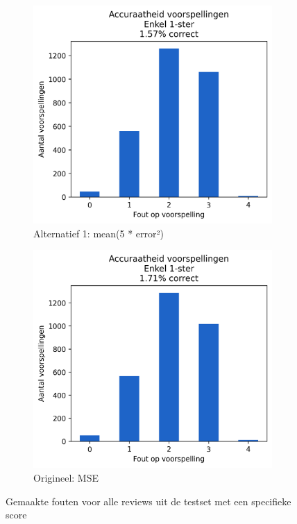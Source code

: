 \begin{figure}[H]
    \begin{subfigure}{.45\textwidth}
        \centering
        \includegraphics[width=1\linewidth]{fig/chapt5/predictor/1ster_nieuwe_loss.png}
        \caption{Alternatief 1: {\selectfont mean(5 * error²)}}
        \label{fig:chapt5_extreem_1ster_nieuwe_loss}
    \end{subfigure}
    \begin{subfigure}{.45\textwidth}
        \centering
        \includegraphics[width=1\linewidth]{fig/chapt5/predictor/extreem_1ster.png}
        \caption{Origineel: MSE}
        \label{fig:chapt5_extreem_4ster_again}
    \end{subfigure}
    \caption{Gemaakte fouten voor alle reviews uit de testset met een specifieke score}
    \label{fig:chapt5_accuracy_lossfunction_combined}
\end{figure}




